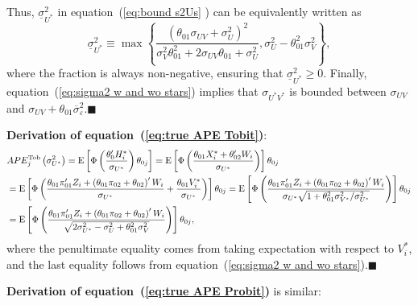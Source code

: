 \documentclass[11pt]{article}
\begin{document}
Thus, $\underline{\sigma }_{U^{\ast }}^{2}$ in equation~(\ref{eq:bound s2Us}%
) can be equivalently written as%
\begin{equation*}
\underline{\sigma }_{U^{\ast }}^{2}\equiv \max \left\{ \frac{\left( \theta
_{01}\sigma _{UV}+\sigma _{U}^{2}\right) ^{2}}{\sigma _{V}^{2}\theta
_{01}^{2}+2\sigma _{UV}\theta _{01}+\sigma _{U}^{2}},\sigma _{U}^{2}-\theta
_{01}^{2}\sigma _{V}^{2}\right\} ,
\end{equation*}%
where the fraction is always non-negative, ensuring that $\underline{\sigma }%
_{U^{\ast }}^{2}\geq 0$. Finally, equation~(\ref{eq:sigma2 w and wo stars})
implies that $\sigma _{U^{\ast }V^{\ast }}$ is bounded between $\sigma _{UV}$
and $\sigma _{UV}+\theta _{01}\overline{\sigma }_{\varepsilon }^{2}$.\hfill $%
\blacksquare $

\bigskip

\noindent \textbf{Derivation of equation~(\ref{eq:true APE Tobit})}: 
\begin{align*}
& APE_{j}^{\text{Tob}}\left( \sigma _{U^{\ast }}^{2}\right) =\mathrm{E}\left[
\Phi \left( \frac{\theta _{0}^{\prime }H_{i}^{\ast }}{\sigma _{U^{\ast }}}%
\right) \theta _{0j}\right] =\mathrm{E}\left[ \Phi \left( \frac{\theta
_{01}X_{i}^{\ast }+\theta _{02}^{\prime }W_{i}}{\sigma _{U^{\ast }}}\right) %
\right] \theta _{0j}{} \\
& =\mathrm{E}\left[ \Phi \left( \frac{\theta _{01}\pi _{01}^{\prime
}Z_{i}+\left( \theta _{01}\pi _{02}+\theta _{02}\right) ^{\prime }W_{i}}{%
\sigma _{U^{\ast }}}+\frac{\theta _{01}V_{i}^{\ast }}{\sigma _{U^{\ast }}}%
\right) \right] \theta _{0j}=\mathrm{E}\left[ \Phi \left( \frac{\theta
_{01}\pi _{01}^{\prime }Z_{i}+\left( \theta _{01}\pi _{02}+\theta
_{02}\right) ^{\prime }W_{i}}{\sigma _{U^{\ast }}\sqrt{1+\theta
_{01}^{2}\sigma _{V^{\ast }}^{2}/\sigma _{U^{\ast }}^{2}}}\right) \right]
\theta _{0j} \\
& ={}\mathrm{E}\left[ \Phi \left( 
\frac{\theta _{01}\pi _{01}^{\prime }Z_{i}+\left( \theta _{01}\pi
_{02}+\theta _{02}\right) ^{\prime }W_{i}}{\sqrt{2\sigma _{U^{\ast
}}^{2}-\sigma _{U}^{2}+\theta _{01}^{2}\sigma _{V}^{2}}}\right) \right]
\theta _{0j},
\end{align*}%
where the penultimate equality comes from taking expectation with respect to 
$V_{i}^{\ast }$, and the last equality follows from equation~(\ref{eq:sigma2
w and wo stars}).\hfill $\blacksquare $

\bigskip

\noindent \textbf{Derivation of equation~(\ref{eq:true APE Probit})} is
similar:
\end{document}
